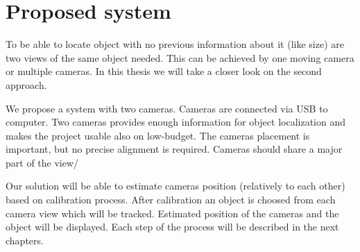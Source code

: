 \chapter{Proposed system}

To be able to locate object with no previous information about it (like size)
are two views of the same object needed. This can be achieved by one moving
camera or multiple cameras. In this thesis we will take a closer look on the
second approach.

We propose a system with two cameras. Cameras are connected via USB to
computer. Two cameras provides enough information for object localization and
makes the project usable also on low-budget. The cameras placement is
important, but no precise alignment is required. Cameras should share a major
part of the view/


Our solution will be able to estimate cameras position (relatively to each
other) based on calibration process. After calibration an object is choosed
from each camera view which will be tracked. Estimated position of the cameras
and the object will be displayed. Each step of the process will be described in
the next chapters.
